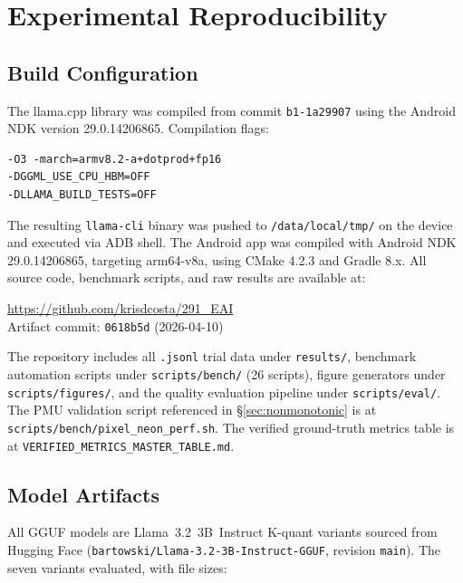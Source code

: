 \documentclass[conference]{IEEEtran}
\begin{document}
\appendix

\section{Experimental Reproducibility}

\subsection{Build Configuration}

The llama.cpp library was compiled from commit \texttt{b1-1a29907} using the
Android NDK version 29.0.14206865. Compilation flags:
\begin{verbatim}
-O3 -march=armv8.2-a+dotprod+fp16
-DGGML_USE_CPU_HBM=OFF
-DLLAMA_BUILD_TESTS=OFF
\end{verbatim}

The resulting \texttt{llama-cli} binary was pushed to \texttt{/data/local/tmp/}
on the device and executed via ADB shell. The Android app was compiled with
Android NDK 29.0.14206865, targeting arm64-v8a, using CMake 4.2.3 and Gradle 8.x.
All source code, benchmark scripts, and raw results are available at:
\begin{center}
\url{https://github.com/krisdcosta/291_EAI}\\
\smallskip
{\small Artifact commit: \texttt{0618b5d} (2026-04-10)}
\end{center}
The repository includes all \texttt{.jsonl} trial data under \texttt{results/},
benchmark automation scripts under \texttt{scripts/bench/} (26 scripts),
figure generators under \texttt{scripts/figures/}, and the quality
evaluation pipeline under \texttt{scripts/eval/}.
The PMU validation script referenced in \S\ref{sec:nonmonotonic} is at
\texttt{scripts/bench/pixel\_neon\_perf.sh}.
The verified ground-truth metrics table is at \texttt{VERIFIED\_METRICS\_MASTER\_TABLE.md}.

\subsection{Model Artifacts}

All GGUF models are Llama~3.2~3B~Instruct K-quant variants sourced from
Hugging Face (\texttt{bartowski/Llama-3.2-3B-Instruct-GGUF}, revision \texttt{main}).
The seven variants evaluated, with file sizes:
\end{document}
